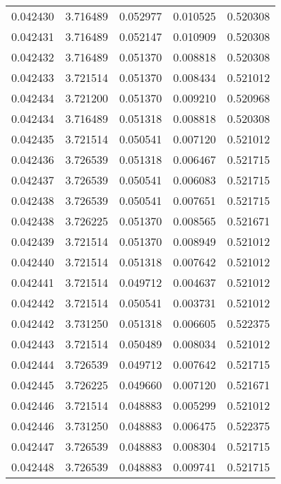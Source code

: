 \begin{tabular}{lrrrr}
0.042430    &  3.716489 &  0.052977 &  0.010525 &             0.520308 \\
0.042431    &  3.716489 &  0.052147 &  0.010909 &             0.520308 \\
0.042432    &  3.716489 &  0.051370 &  0.008818 &             0.520308 \\
0.042433    &  3.721514 &  0.051370 &  0.008434 &             0.521012 \\
0.042434    &  3.721200 &  0.051370 &  0.009210 &             0.520968 \\
0.042434    &  3.716489 &  0.051318 &  0.008818 &             0.520308 \\
0.042435    &  3.721514 &  0.050541 &  0.007120 &             0.521012 \\
0.042436    &  3.726539 &  0.051318 &  0.006467 &             0.521715 \\
0.042437    &  3.726539 &  0.050541 &  0.006083 &             0.521715 \\
0.042438    &  3.726539 &  0.050541 &  0.007651 &             0.521715 \\
0.042438    &  3.726225 &  0.051370 &  0.008565 &             0.521671 \\
0.042439    &  3.721514 &  0.051370 &  0.008949 &             0.521012 \\
0.042440    &  3.721514 &  0.051318 &  0.007642 &             0.521012 \\
0.042441    &  3.721514 &  0.049712 &  0.004637 &             0.521012 \\
0.042442    &  3.721514 &  0.050541 &  0.003731 &             0.521012 \\
0.042442    &  3.731250 &  0.051318 &  0.006605 &             0.522375 \\
0.042443    &  3.721514 &  0.050489 &  0.008034 &             0.521012 \\
0.042444    &  3.726539 &  0.049712 &  0.007642 &             0.521715 \\
0.042445    &  3.726225 &  0.049660 &  0.007120 &             0.521671 \\
0.042446    &  3.721514 &  0.048883 &  0.005299 &             0.521012 \\
0.042446    &  3.731250 &  0.048883 &  0.006475 &             0.522375 \\
0.042447    &  3.726539 &  0.048883 &  0.008304 &             0.521715 \\
0.042448    &  3.726539 &  0.048883 &  0.009741 &             0.521715 \\

\end{tabular}
